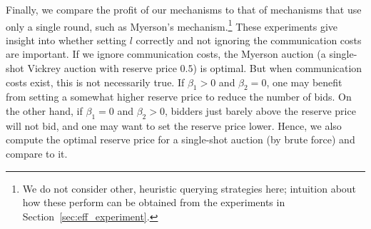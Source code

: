 Finally, we compare the profit of our mechanisms to that of mechanisms that
use only a single round, such as Myerson's mechanism.\footnote{We do not
  consider other, heuristic querying strategies here; intuition about how
  these perform can be obtained from the experiments in
  Section~\ref{sec:eff_experiment}.}  These experiments 
give insight into whether setting $l$ correctly and  not ignoring the
communication costs are important.
If we ignore communication costs, 
the Myerson auction (a single-shot Vickrey
auction with reserve price $0.5$) is optimal.
But when communication costs exist, this is not necessarily true.  If
$\beta_1 > 0$ and $\beta_2 = 0$, one may
benefit from setting a somewhat higher reserve price to reduce the number
of bids.  On the other hand, if $\beta_1=0$ and $\beta_2 > 0$, bidders just
barely above the reserve price will not bid, and one may want to set the
reserve price lower. Hence, we also compute the optimal reserve price for a
single-shot auction (by
brute force) and compare to it.


